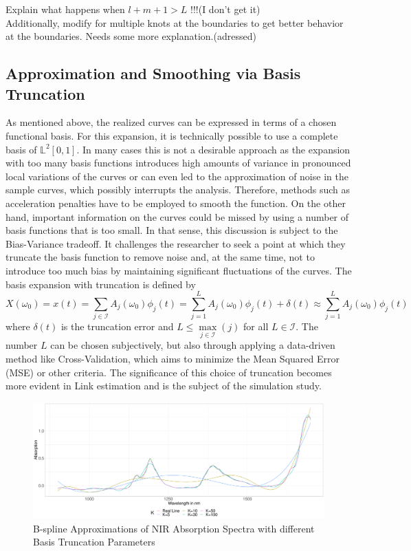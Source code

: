 \documentclass[11pt,twoside,a4paper]{article}
\begin{document}
	
	{\color{red}Explain what happens when $l+m+1 > L$ !!!(I don't get it)\\
		Additionally, modify for multiple knots at the boundaries to get better behavior at the boundaries. Needs some more explanation.(adressed)}	
	
	\subsection{Approximation and Smoothing via Basis Truncation}
	As mentioned above, the realized curves can be expressed in terms of a chosen functional basis. For this expansion, it is technically possible to use a complete basis of $\mathbb{L}^2[0,1]$. In many cases this is not a desirable approach as the expansion with too many basis functions introduces high amounts of variance in pronounced local variations of the curves or can even led to the approximation of noise in the sample curves, which possibly interrupts the analysis. {\color{red} Therefore, methods such as acceleration penalties have to be employed to smooth the function.} On the other hand, important information on the curves could be missed by using a number of basis functions that is too small. In that sense, this discussion is subject to the Bias-Variance tradeoff. It challenges the researcher to seek a point at which they truncate the basis function to remove noise and, at the same time, not to introduce too much bias by maintaining significant fluctuations of the curves. The basis expansion with truncation is defined by
	\begin{equation}
		X(\omega_0) = x(t) = \sum_{j \in \mathcal{I}} A_j(\omega_0) \phi_j(t) = \sum_{j = 1}^{L} A_j(\omega_0) \phi_j(t) + \delta(t) \approx \sum_{j = 1}^{L} A_j(\omega_0) \phi_j(t)
	\end{equation}
	where $\delta(t)$ is the truncation error and $L \leq \max\limits_{j \in \mathcal{I}}(j)$ for all $L \in \mathcal{I}$. The number $L$ can be chosen subjectively, but also through applying a data-driven method like Cross-Validation, which aims to minimize the Mean Squared Error (MSE) or other criteria. The significance of this choice of truncation becomes more evident in {\color{green} Link estimation} and is the subject of the simulation study. 
	
	\begin{figure}[H]
		\includegraphics[width=\textwidth]{../Graphics/basis_expansions.pdf}
		\caption{B-spline Approximations of NIR Absorption Spectra with different Basis Truncation Parameters}
	\end{figure}
	
\end{document}
